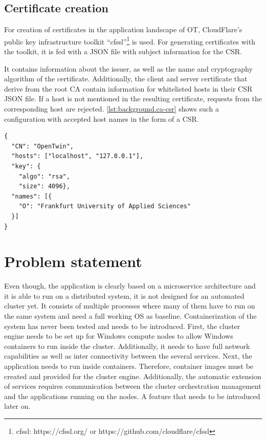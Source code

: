 \subsection{Certificate creation}
For creation of certificates in the application landscape of \ac{OT}, CloudFlare's public key infrastructure toolkit \enquote{cfssl}\footnote{cfssl: https://cfssl.org/ or https://github.com/cloudflare/cfssl} is used.
For generating certificates with the toolkit, it is fed with a JSON file with subject information for the \ac{CSR}.

It contains information about the issuer, as well as the name and cryptography algorithm of the certificate.
Additionally, the client and server certificate that derive from the root \ac{CA} contain information for whitelisted hosts in their \ac{CSR} JSON file. If a host is not mentioned in the resulting certificate, requests from the corresponding host are rejected.
\autoref{lst:background.ca-csr} shows such a configuration with accepted host names in the form of a \ac{CSR}.

\begin{lstlisting}[label=lst:background.ca-csr, caption={Example of meta data in form of \ac{CSR} configuration. \enquote{CN} is the certificate name. \enquote{hosts} describes the accepted hostnames, \enquote{key} describes information about the cryptography algorithm, \enquote{names} contains meta data of the organization}]
{
  "CN": "OpenTwin",
  "hosts": ["localhost", "127.0.0.1"],
  "key": {
    "algo": "rsa",
    "size": 4096},
  "names": [{
    "O": "Frankfurt University of Applied Sciences"
  }]
}
\end{lstlisting}


\section{Problem statement}
Even though, the application is clearly based on a microservice architecture and it is able to run on a distributed system, it is not designed for an automated cluster yet.
It consists of multiple processes where many of them have to run on the same system and need a full working \ac{OS} as baseline.  %
Containerization of the system has never been tested and needs to be introduced. 
First, the cluster engine needs to be set up for \ac{Windows} compute nodes to allow \ac{Windows} containers to run inside the cluster. Additionally, it needs to have full network capabilities as well as inter connectivity between the several services.
Next, the application needs to run inside containers. Therefore, container images must be created and provided for the cluster engine. 
Additionally, the automatic extension of services requires communication between the cluster orchestration management and the applications running on the nodes. A feature that needs to be introduced later on.

